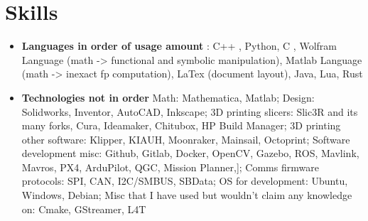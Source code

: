 \documentclass[letterpaper,10pt]{article}
\newcommand{\resumeSubHeadingListStart}{\begin{itemize}[leftmargin=*]}
\newcommand{\resumeSubHeadingListEnd}{\end{itemize}}
\newcommand{\shorterSection}[1]{\vspace{-10pt}\section{#1}}
\begin{document}
\shorterSection{Skills}
  \resumeSubHeadingListStart
  \small
    \item{
     \textbf{Languages in order of usage amount }{: C++ , Python, C , Wolfram Language (math -> functional and symbolic manipulation),  Matlab Language (math -> inexact fp computation), LaTex (document layout), Java, Lua, Rust }}
     \item{
     \textbf{Technologies not in order}{ Math: Mathematica, Matlab; Design: Solidworks, Inventor, AutoCAD, Inkscape; 3D printing slicers: Slic3R and its many forks, Cura, Ideamaker, Chitubox, HP Build Manager; 3D printing other software: Klipper, KIAUH, Moonraker, Mainsail, Octoprint; Software development misc: Github, Gitlab, Docker, OpenCV, Gazebo, ROS, Mavlink, Mavros, PX4, ArduPilot, QGC, Mission Planner,]; Comms firmware protocols: SPI, CAN, I2C/SMBUS, SBData; OS for development: Ubuntu, Windows, Debian; Misc that I have used but wouldn't claim any knowledge on: Cmake, GStreamer, L4T}
    }
\resumeSubHeadingListEnd
\end{document}
